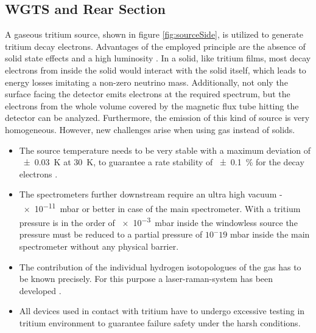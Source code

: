       
      \subsection{WGTS and Rear Section}
      \label{ch:The KATRIN experiment:sec:Experimental setup:subsec:sourceSide}
      A gaseous tritium source, shown in figure \ref{fig:sourceSide}, is utilized to generate tritium decay electrons. Advantages of the employed principle are the absence of solid state effects and a high luminosity \cite{letterOfIntent}. In a solid, like tritium films, most decay electrons from inside the solid would interact with the solid itself, which leads to energy losses imitating a non-zero neutrino mass. Additionally, not only the surface facing the detector emits electrons at the required spectrum, but the electrons from the whole volume covered by the magnetic flux tube hitting the detector can be analyzed. Furthermore, the emission of this kind of source is very homogeneous. However, new challenges arise when using gas instead of solids.
      \begin{itemize}
		\item The source temperature needs to be very stable with a maximum deviation of \SI{\pm0.03}{\kelvin} at \SI{30}{\kelvin}, to guarantee a rate stability of \SI{\pm0.1}{\percent} for the decay electrons \cite{temperatureWGTS}.
      	\item The spectrometers further downstream require an ultra high vacuum - \SI{e-11}{\milli\bar} or better in case of the main spectrometer. With a tritium pressure is in the order of \SI{e-3}{\milli\bar} inside the windowless source the pressure must be reduced to a partial pressure of $10^-19$ mbar inside the main spectrometer without any physical barrier.
      	\item The contribution of the individual hydrogen isotopologues of the gas has to be known precisely. For this purpose a laser-raman-system has been developed \cite{calibrationRaman}.
      	\item All devices used in contact with tritium have to undergo excessive testing in tritium environment to guarantee failure safety under the harsh conditions.
      \end{itemize}
      
